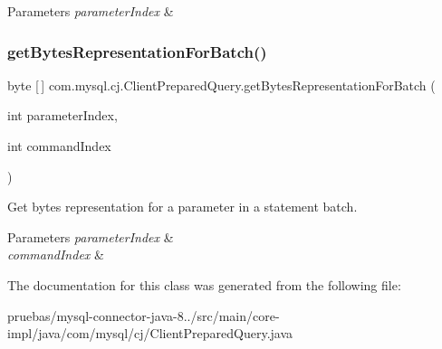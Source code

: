 \begin{DoxyParams}{Parameters}
{\em parameter\+Index} & \\
\hline
\end{DoxyParams}
\mbox{\label{classcom_1_1mysql_1_1cj_1_1_client_prepared_query_a591dea27c5fc2a48b36978c8c23a92de}} 
\subsubsection{\texorpdfstring{get\+Bytes\+Representation\+For\+Batch()}{getBytesRepresentationForBatch()}}
{\footnotesize\ttfamily byte \mbox{[}$\,$\mbox{]} com.\+mysql.\+cj.\+Client\+Prepared\+Query.\+get\+Bytes\+Representation\+For\+Batch (\begin{DoxyParamCaption}\item[{int}]{parameter\+Index,  }\item[{int}]{command\+Index }\end{DoxyParamCaption})}

Get bytes representation for a parameter in a statement batch.


\begin{DoxyParams}{Parameters}
{\em parameter\+Index} & \\
\hline
{\em command\+Index} & \\
\hline
\end{DoxyParams}


The documentation for this class was generated from the following file\+:\begin{DoxyCompactItemize}
\item 
pruebas/mysql-\/connector-\/java-\/8../src/main/core-\/impl/java/com/mysql/cj/Client\+Prepared\+Query.\+java\end{DoxyCompactItemize}
